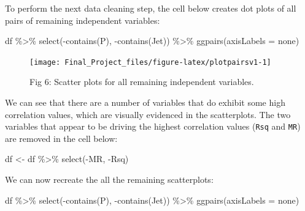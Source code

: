 \documentclass[
]{article}
\newenvironment{Shaded}{\begin{snugshade}}{\end{snugshade}}
\newcommand{\AttributeTok}[1]{\textcolor[rgb]{0.77,0.63,0.00}{#1}}
\newcommand{\FunctionTok}[1]{\textcolor[rgb]{0.00,0.00,0.00}{#1}}
\newcommand{\NormalTok}[1]{#1}
\newcommand{\OtherTok}[1]{\textcolor[rgb]{0.56,0.35,0.01}{#1}}
\newcommand{\SpecialCharTok}[1]{\textcolor[rgb]{0.00,0.00,0.00}{#1}}
\newcommand{\StringTok}[1]{\textcolor[rgb]{0.31,0.60,0.02}{#1}}
\begin{document}
To perform the next data cleaning step, the cell below creates dot plots
of all pairs of remaining independent variables:

\begin{Shaded}
\begin{Highlighting}[]
\NormalTok{df }\SpecialCharTok{\%\textgreater{}\%}
  \FunctionTok{select}\NormalTok{(}\SpecialCharTok{{-}}\FunctionTok{contains}\NormalTok{(}\StringTok{\textquotesingle{}P\textquotesingle{}}\NormalTok{), }\SpecialCharTok{{-}}\FunctionTok{contains}\NormalTok{(}\StringTok{\textquotesingle{}Jet\textquotesingle{}}\NormalTok{)) }\SpecialCharTok{\%\textgreater{}\%}
    \FunctionTok{ggpairs}\NormalTok{(}\AttributeTok{axisLabels =} \StringTok{\textquotesingle{}none\textquotesingle{}}\NormalTok{)}
\end{Highlighting}
\end{Shaded}

\begin{figure}

{\centering \texttt{[image: Final\_Project\_files/figure-latex/plotpairsv1-1]} 

}

\caption{Fig 6: Scatter plots for all remaining independent variables.}\label{fig:plotpairsv1}
\end{figure}

We can see that there are a number of variables that do exhibit some
high correlation values, which are visually evidenced in the
scatterplots. The two variables that appear to be driving the highest
correlation values (\texttt{Rsq} and \texttt{MR}) are removed in the
cell below:

\begin{Shaded}
\begin{Highlighting}[]
\NormalTok{df }\OtherTok{\textless{}{-}}\NormalTok{ df }\SpecialCharTok{\%\textgreater{}\%}
  \FunctionTok{select}\NormalTok{(}\SpecialCharTok{{-}}\NormalTok{MR, }\SpecialCharTok{{-}}\NormalTok{Rsq)}
\end{Highlighting}
\end{Shaded}

We can now recreate the all the remaining scatterplots:

\begin{Shaded}
\begin{Highlighting}[]
\NormalTok{df }\SpecialCharTok{\%\textgreater{}\%}
  \FunctionTok{select}\NormalTok{(}\SpecialCharTok{{-}}\FunctionTok{contains}\NormalTok{(}\StringTok{\textquotesingle{}P\textquotesingle{}}\NormalTok{), }\SpecialCharTok{{-}}\FunctionTok{contains}\NormalTok{(}\StringTok{\textquotesingle{}Jet\textquotesingle{}}\NormalTok{)) }\SpecialCharTok{\%\textgreater{}\%}
    \FunctionTok{ggpairs}\NormalTok{(}\AttributeTok{axisLabels =} \StringTok{\textquotesingle{}none\textquotesingle{}}\NormalTok{)}
\end{Highlighting}
\end{Shaded}
\end{document}

